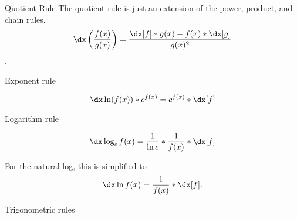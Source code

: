 \begin{psec}{Quotient Rule}\label{rule:derivative quotient} The quotient rule is just an extension of the
    power, product, and chain rules.
    \begin{equation}
        \dx \left(\frac{f(x)}{g(x)}\right) = \frac{\dx[f] * g(x) - f(x) * \dx[g]
        }{g(x)^2}
    \end{equation}.

\end{psec}

\begin{psec}{Exponent rule}\label{rule:derivative exponent}

    \begin{equation}
        \dx \ln(f(x)) * c ^ {f(x)} = c ^ {f(x)} * \dx[f]
    \end{equation}

\end{psec}

\begin{psec}{Logarithm rule}\label{rule:derivative log}

    \begin{equation}
        \dx \log_c f(x) = \frac{1}{\ln c} * \frac{1}{f(x)} * \dx[f]
    \end{equation}

    For the natural log, this is simplified to 
    \begin{equation*}
        \dx \ln f(x) = \frac{1}{f(x)} * \dx[f].
    \end{equation*}

\end{psec}


\begin{psec}{Trigonometric rules}


\end{psec}
